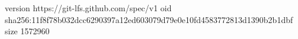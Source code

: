 version https://git-lfs.github.com/spec/v1
oid sha256:11f8f78b032dcc6290397a12ed603079d79e0e10fd4583772813d1390b2b1dbf
size 1572960
